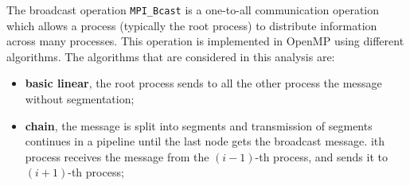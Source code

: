 The broadcast operation \texttt{MPI\_Bcast} is a one-to-all communication operation which allows a process (typically the root process) to distribute information across many processes. This operation is implemented in OpenMP using different algorithms. The algorithms that are considered in this analysis are:
\begin{itemize}
    \item \textbf{basic linear}, the root process sends to all the other process the message without segmentation;
    \begin{center}
    \end{center}

    \item \textbf{chain}, the message is split into segments and transmission of segments continues in a pipeline until the last node gets the broadcast message. ith process receives the message from the $(i-1)$-th process, and sends it to $(i+1)$-th process;
    
    \begin{center}
    \end{center}


\end{itemize}
